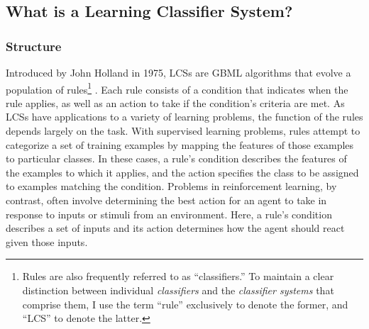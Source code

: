 \documentclass[12pt,twoside]{article}
\begin{document}
\subsection{What is a Learning Classifier System?}

\subsubsection{Structure}

Introduced by John Holland in 1975, LCSs are GBML algorithms that evolve a population of rules\footnote{Rules are also frequently referred to as ``classifiers.'' To maintain a clear distinction between individual \emph{classifiers} and the \emph{classifier systems} that comprise them, I use the term ``rule'' exclusively to denote the former, and ``LCS'' to denote the latter.} \cite{holland_adaptation_1975}. Each rule consists of a condition that indicates when the rule applies, as well as an action to take if the condition's criteria are met. As LCSs have applications to a variety of learning problems, the function of the rules depends largely on the task. With supervised learning problems, rules attempt to categorize a set of training examples by mapping the features of those examples to particular classes. In these cases, a rule's condition describes the features of the examples to which it applies, and the action specifies the class to be assigned to examples matching the condition. Problems in reinforcement learning, by contrast, often involve determining the best action for an agent to take in response to inputs or stimuli from an environment. Here, a rule's condition describes a set of inputs and its action determines how the agent should react given those inputs.
\end{document}
